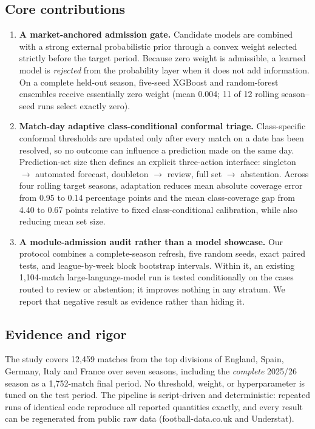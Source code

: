 \documentclass[11pt]{article}
\begin{document}
\subsection*{Core contributions}

\begin{enumerate}
\item \textbf{A market-anchored admission gate.} Candidate models are combined
with a strong external probabilistic prior through a convex weight selected
strictly before the target period. Because zero weight is admissible, a
learned model is \emph{rejected} from the probability layer when it does not
add information. On a complete held-out season, five-seed XGBoost and
random-forest ensembles receive essentially zero weight (mean 0.004; 11 of 12
rolling season--seed runs select exactly zero).

\item \textbf{Match-day adaptive class-conditional conformal triage.}
Class-specific conformal thresholds are updated only after every match on a
date has been resolved, so no outcome can influence a prediction made on the
same day. Prediction-set size then defines an explicit three-action interface:
singleton $\rightarrow$ automated forecast, doubleton $\rightarrow$ review,
full set $\rightarrow$ abstention. Across four rolling target seasons,
adaptation reduces mean absolute coverage error from 0.95 to 0.14 percentage
points and the mean class-coverage gap from 4.40 to 0.67 points relative to
fixed class-conditional calibration, while also reducing mean set size.

\item \textbf{A module-admission audit rather than a model showcase.} Our
protocol combines a complete-season refresh, five random seeds, exact paired
tests, and league-by-week block bootstrap intervals. Within it, an existing
1,104-match large-language-model run is tested conditionally on the cases
routed to review or abstention; it improves nothing in any stratum. We report
that negative result as evidence rather than hiding it.
\end{enumerate}

\subsection*{Evidence and rigor}

The study covers 12,459 matches from the top divisions of England, Spain,
Germany, Italy and France over seven seasons, including the \emph{complete}
2025/26 season as a 1,752-match final period. No threshold, weight, or
hyperparameter is tuned on the test period. The pipeline is script-driven and
deterministic: repeated runs of identical code reproduce all reported
quantities exactly, and every result can be regenerated from public raw data
(football-data.co.uk and Understat).
\end{document}
